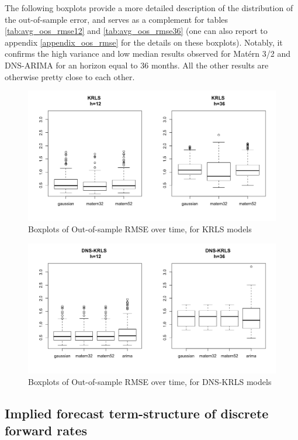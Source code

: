 \begin{table}[!htb]
The following boxplots provide a more detailed description of the distribution of the out-of-sample error, and serves as a complement for tables \ref{tab:avg_oos_rmse12} and \ref{tab:avg_oos_rmse36} (one can also report to appendix \ref{appendix_oos_rmse} for the details on these boxplots). Notably, it confirms the high variance and low median results observed for Mat\'ern 3/2 and DNS-ARIMA for an horizon equal to $36$ months. All the other results are otherwise pretty close to each other. 

\begin{figure}[!htb]
\centering
\includegraphics[width=13cm]{gfx/chapter-krls-models/oos_rmse_dns_krls_1}
\caption{Boxplots of Out-of-sample RMSE over time, for KRLS models}
\label{oos_rmse_dns_krls_1}
\end{figure}

\begin{figure}[!htb]
\centering
\includegraphics[width=12cm]{gfx/chapter-krls-models/oos_rmse_dns_krls_2}
\caption{Boxplots of Out-of-sample RMSE over time, for DNS-KRLS models}
\label{oos_rmse_dns_krls_2}
\end{figure}

\newpage

\subsection{Implied forecast term-structure of discrete forward rates}
\label{sec:fcast_curves}


\end{table}
